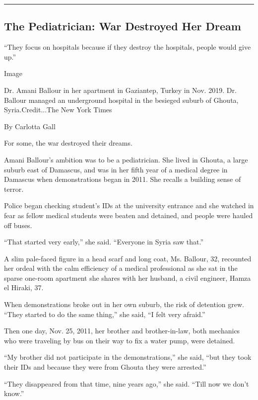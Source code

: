\begin{center}\rule{0.5\linewidth}{\linethickness}\end{center}

\hypertarget{the-pediatrician-war-destroyed-her-dream}{%
\subsection{The Pediatrician: War Destroyed Her
Dream}\label{the-pediatrician-war-destroyed-her-dream}}

``They focus on hospitals because if they destroy the hospitals, people
would give up.''

Image

Dr. Amani Ballour in her apartment in Gaziantep, Turkey in Nov. 2019.
Dr. Ballour managed an underground hospital in the besieged suburb of
Ghouta, Syria.Credit...The New York Times

By Carlotta Gall

For some, the war destroyed their dreams.

Amani Ballour's ambition was to be a pediatrician. She lived in Ghouta,
a large suburb east of Damascus, and was in her fifth year of a medical
degree in Damascus when demonstrations began in 2011. She recalls a
building sense of terror.

Police began checking student's IDs at the university entrance and she
watched in fear as fellow medical students were beaten and detained, and
people were hauled off buses.

``That started very early,'' she said. ``Everyone in Syria saw that.''

A slim pale-faced figure in a head scarf and long coat, Ms. Ballour, 32,
recounted her ordeal with the calm efficiency of a medical professional
as she sat in the sparse one-room apartment she shares with her husband,
a civil engineer, Hamza el Hiraki, 37.

When demonstrations broke out in her own suburb, the risk of detention
grew. ``They started to do the same thing,'' she said, ``I felt very
afraid.''

Then one day, Nov. 25, 2011, her brother and brother-in-law, both
mechanics who were traveling by bus on their way to fix a water pump,
were detained.

``My brother did not participate in the demonstrations,'' she said,
``but they took their IDs and because they were from Ghouta they were
arrested.''

``They disappeared from that time, nine years ago,'' she said. ``Till
now we don't know.''

